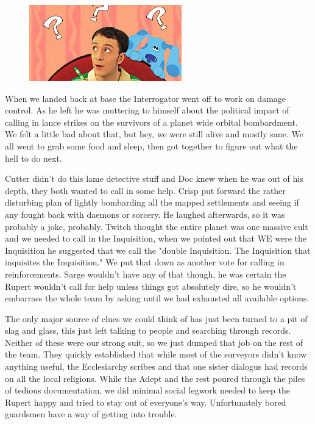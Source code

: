 \begin{figure}
	\begin{center}
		\includegraphics[width=\figwidth]{pics/6/19.png}
	\end{center}
\end{figure}
When we landed back at base the Interrogator went off to work on damage control. 
As he left he was muttering to himself about the political impact of calling in lance strikes on the survivors of a planet wide orbital bombardment. 
We felt a little bad about that, but hey, we were still alive and mostly sane. 
We all went to grab some food and sleep, then got together to figure out what the hell to do next.

Cutter didn't do this lame detective stuff and Doc knew when he was out of his depth, they both wanted to call in some help. 
Crisp put forward the rather disturbing plan of lightly bombarding all the mapped settlements and seeing if any fought back with daemons or sorcery. 
He laughed afterwards, so it was probably a joke, probably. 
Twitch thought the entire planet was one massive cult and we needed to call in the Inquisition, when we pointed out that WE were the Inquisition he suggested that we call the "double Inquisition. 
The Inquisition that inquisites the Inquisition." We put that down as another vote for calling in reinforcements. 
Sarge wouldn't have any of that though, he was certain the Rupert wouldn't call for help unless things got absolutely dire, so he wouldn't embarrass the whole team by asking until we had exhausted all available options.

The only major source of clues we could think of has just been turned to a pit of slag and glass, this just left talking to people and searching through records. 
Neither of these were our strong suit, so we just dumped that job on the rest of the team. %
They quickly established that while most of the surveyors didn't know anything useful, the Ecclesiarchy scribes and that one sister dialogus had records on all the local religions. 
While the Adept and the rest poured through the piles of tedious documentation, we did minimal social legwork needed to keep the Rupert happy and tried to stay out of everyone's way. 
Unfortunately bored guardsmen have a way of getting into trouble.

